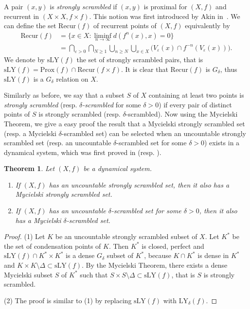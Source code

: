 \documentclass[reqno,a4paper,12pt]{amsart}
\newtheorem{thm}{Theorem}[section]
\theoremstyle{definition}
\numberwithin{equation}{section}
\begin{document}
A pair $(x,y)$ is \emph{strongly scrambled}
if $(x,y)$ is proximal for $(X,f)$ and recurrent in $(X\times X,f\times f)$.
This notion was first introduced by Akin in~\cite{A04}.
We can define the set $\mathrm{Recur}(f)$ of recurrent points of $(X,f)$ equivalently by
\begin{align*}
  \mathrm{Recur}(f)&=\{x\in X\colon \liminf_{n\to\infty} d(f^n(x),x)=0\}\\
          &=\bigcap_{\varepsilon>0} \bigcap_{N\geq 1}\bigcup_{n\geq N}
          \bigcup_{x\in X}\bigl(V_{\varepsilon}(x)\cap f^{-n}(V_{\varepsilon}(x))\bigr).
\end{align*}
We denote by $\mathrm{sLY}(f)$ the set of strongly scrambled pairs, that is $\mathrm{sLY}(f)=\mathrm{Prox}(f)\cap \mathrm{Recur}(f\times f)$.
It is clear that $\mathrm{Recur}(f)$ is $G_\delta$, thus $\mathrm{sLY}(f)$ is a $G_\delta$ relation on $X$.

Similarly as before, we say that a subset $S$ of $X$ containing at least two points
is \emph{strongly scrambled} (resp. \emph{$\delta$-scrambled} for some $\delta>0$)
if every pair of distinct points of $S$ is strongly scrambled (resp. $\delta$-scrambled).
Now using the Mycielski Theorem, we give a easy proof the result that a Mycielski strongly scrambled set
(resp. a Mycielski $\delta$-scrambled set)
can be selected when an uncountable strongly scrambled set
(resp. an uncountable $\delta$-scrambled set for some $\delta>0$)
exists in a dynamical system, which was first proved in \cite[Theorem 6.10]{A04} (resp. \cite[Theorem 16]{BHS}).
\begin{thm}\label{thm:uncountable-to-Mycielski-1}
Let $(X,f)$ be a dynamical system.
\begin{enumerate}
\item If $(X,f)$ has an uncountable strongly scrambled set, then
it also has a Mycielski strongly scrambled set.
\item If $(X,f)$ has an uncountable $\delta$-scrambled set for some $\delta>0$,
then it also has a Mycielski $\delta$-scrambled set.
\end{enumerate}
\end{thm}
\begin{proof}
(1) Let $K$ be an uncountable strongly scrambled subset of $X$.
Let $K^*$ be the set of condensation points of $K$.
Then $K^*$ is closed, perfect
and $\mathrm{sLY}(f)\cap K^*\times K^*$ is a dense  $G_\delta$ subset of $K^*$,
because $K\cap K^*$ is dense in $K^*$ and $K\times K\setminus \Delta\subset \mathrm{sLY}(f)$.
By the Mycielski Theorem, there exists a dense Mycielski subset $S$ of $K^*$
such that $S\times S\setminus \Delta\subset \mathrm{sLY}(f)$, that is $S$ is strongly scrambled.

(2) The proof is similar to (1) by replacing $\mathrm{sLY}(f)$ with $\mathrm{LY}_\delta(f)$.
\end{proof}
\end{document}
